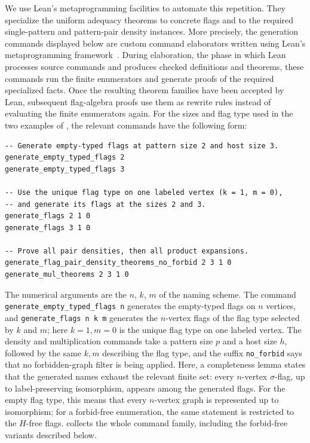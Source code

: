 \documentclass{article}
\newcommand{\lean}[1]{\texttt{#1}}
\begin{document}
We use Lean's metaprogramming facilities to automate this repetition.  They
specialize the uniform adequacy theorems to concrete flags and to the required
single-pattern and pattern-pair density instances.  More precisely, the
generation commands displayed below are custom command
elaborators written using Lean's metaprogramming
framework~\cite{ebner2017structured}.  During
elaboration, the phase in which Lean processes source commands and produces
checked definitions and theorems, these commands run the finite enumerators
and generate proofs of the required specialized facts.  Once the resulting
theorem families have been accepted by Lean, subsequent flag-algebra proofs
use them as rewrite rules instead of evaluating the finite enumerators again.
For the
sizes and flag type used in the two examples of
, the relevant commands have
the following form:
\begin{lstlisting}[emph={generate_empty_typed_flags,generate_flags,generate_flag_pair_density_theorems_no_forbid,generate_mul_theorems},emphstyle=\color{blue!70!black}\bfseries]
-- Generate empty-typed flags at pattern size 2 and host size 3.
generate_empty_typed_flags 2
generate_empty_typed_flags 3

-- Use the unique flag type on one labeled vertex (k = 1, m = 0),
-- and generate its flags at the sizes 2 and 3.
generate_flags 2 1 0
generate_flags 3 1 0

-- Prove all pair densities, then all product expansions.
generate_flag_pair_density_theorems_no_forbid 2 3 1 0
generate_mul_theorems 2 3 1 0
\end{lstlisting}

The numerical arguments are the \(n\), \(k\), \(m\) of the naming scheme.  The
command \lean{generate\allowbreak\_empty\allowbreak\_typed\allowbreak\_flags n} generates the empty-typed flags
on \(n\) vertices, and \lean{generate\_flags n k m} generates the \(n\)-vertex
flags of the flag type selected by \(k\) and \(m\); here \(k=1,m=0\) is the unique
flag type on one labeled vertex.  The density and multiplication commands take a
pattern size \(p\) and a host size \(h\), followed by the same \(k,m\)
describing the flag type, and the suffix \lean{no\_forbid} says that no
forbidden-graph filter is being applied.
Here, a completeness lemma states that the generated names exhaust the
relevant finite set: every \(n\)-vertex \(\sigma\)-flag, up to
label-preserving isomorphism, appears among the generated flags.  For the empty
flag type, this means that every \(n\)-vertex graph is represented up to
isomorphism; for a forbid-free enumeration, the same statement is restricted
to the \(H\)-free flags.
 collects the whole command family, including
the forbid-free variants described below.
\end{document}
